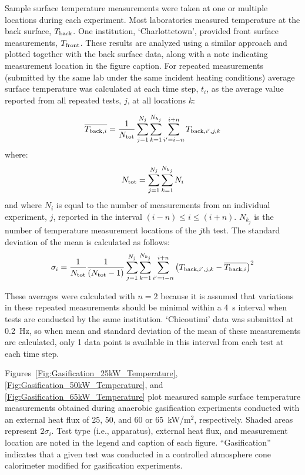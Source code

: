 \documentclass{book}
\begin{document}
Sample surface temperature measurements were taken at one or multiple locations during each experiment. Most laboratories measured temperature at the back surface, $T_{\rm back}$. One institution, ‘Charlottetown’, provided front surface measurements, $T_{\rm front}$. These results are analyzed using a similar approach and plotted together with the back surface data, along with a note indicating measurement location in the figure caption. For repeated measurements (submitted by the same lab under the same incident heating conditions) average surface temperature was calculated at each time step, $t_i$, as the average value reported from all repeated tests, $j$, at all locations $k$:

\begin{equation}
  \overline{ T_{{\rm back},i} } = \frac{1}{N_{\rm tot}} \sum_{j=1}^{N_j} \sum_{k=1}^{N_{k_j}} \sum_{i'=i-n}^{i+n} T_{{\rm back},i',j,k} 
\end{equation}
where:
\begin{equation}
N_{\rm tot}={\sum_{j=1}^{N_j}\sum_{k=1}^{N_{k_j}}N_i}
\end{equation}
and where $N_i$ is equal to the number of measurements from an individual experiment, $j$, reported in the interval $(i-n) \leq i \leq (i+n)$. $N_{k_j}$ is the number of temperature measurement locations of the $j$th test. The standard deviation of the mean is calculated as follows:
\begin{equation}
   \sigma_i = \frac{1}{N_{\rm tot}} \frac{1}{(N_{\rm tot}-1)}
    \sum_{j=1}^{N_j} \sum_{k=1}^{N_{k_j}} \sum_{i'=i-n}^{i+n} \left( T_{{\rm back},i',j,k} - \overline{ T_{{\rm back},i} }  \right)^2
\end{equation}


These averages were calculated with $n=2$ because it is assumed that variations in these repeated measurements should be minimal within a 4~s interval when tests are conducted by the same institution. ‘Chicoutimi’ data was submitted at 0.2~Hz, so when mean and standard deviation of the mean of these measurements are calculated, only 1 data point is available in this interval from each test at each time step.

Figures~\ref{Fig:Gasification_25kW_Temperature}, \ref{Fig:Gasification_50kW_Temperature}, and \ref{Fig:Gasification_65kW_Temperature} plot measured sample surface temperature measurements obtained during anaerobic gasification experiments conducted with an external heat flux of 25, 50, and 60 or 65~kW/m$^2$, respectively. Shaded areas represent $2\sigma_i$. Test type (i.e., apparatus), external heat flux, and measurement location are noted in the legend and caption of each figure. ``Gasification'' indicates that a given test was conducted in a controlled atmosphere cone calorimeter modified for gasification experiments.
\end{document}
